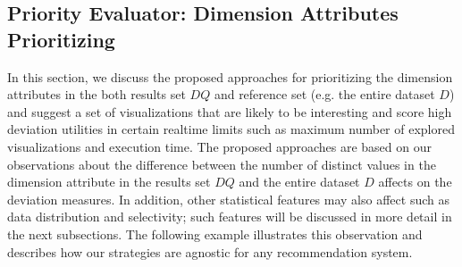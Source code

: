 \subsection{Priority Evaluator: Dimension Attributes Prioritizing}
\label{sec:priority_evaluator}
%
In this section, we discuss the proposed approaches for
prioritizing the dimension attributes in the both results set $DQ$ and reference 
set (e.g. the entire dataset $D$) and suggest a set of visualizations that are likely 
to be interesting and score high deviation utilities in certain realtime limits 
such as maximum number of explored visualizations and execution time.
The proposed approaches are based on our observations about 
the difference between the number of distinct values in the dimension attribute in 
the results set $DQ$ and the entire dataset $D$ affects on the deviation measures. 
In addition, other statistical features may also affect such as data distribution 
and selectivity; such features will be discussed in more detail in the next subsections.
 The following example illustrates this observation and 
describes how our strategies are agnostic for any recommendation system. 
%

